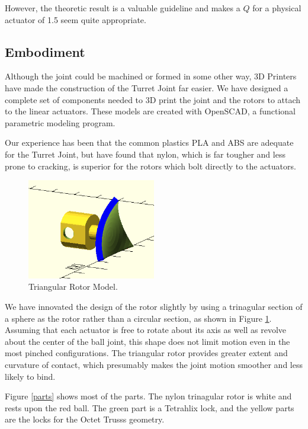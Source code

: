 \documentclass[11pt]{article}
\begin{document}
 However, the theoretic result is a valuable guideline and makes a $Q$ for a physical actuator of 1.5 seem quite appropriate.

 \subsection{Embodiment}

 Although the joint could be machined or formed in some other way,
 3D Printers have made the construction of the Turret Joint far easier.
 We have designed a complete set of components needed to 3D print the joint and the rotors to attach to
 the linear actuators. These models are created with OpenSCAD, a functional parametric modeling program.

 Our experience has been that the common plastics PLA and ABS are adequate for the Turret Joint,
 but have found that nylon, which is far tougher and less prone to cracking, is superior for the
 rotors which bolt directly to the actuators.

 \begin{figure}[!ht]
  \centering
    \includegraphics[width=0.5\textwidth]{RotorModel.png}
    \caption[Triangular Rotor Model]{Triangular Rotor Model.}
      \label{rotormodel}
\end{figure}

 We have innovated the design of the rotor slightly by using a trinagular section of a sphere as the
 rotor rather than a circular section, as shown in Figure \ref{rotormodel}.
 Assuming that each actuator is free to rotate about its axis as well as revolve about the
 center of the ball joint, this shape does not limit motion even in the most pinched
 configurations. The triangular rotor provides greater extent and curvature of contact,
 which presumably makes the joint motion
 smoother and less likely to bind.
 

 Figure \ref{parts} shows most of the parts. The nylon trinagular rotor is white and rests upon
 the red ball. The green part is a Tetrahlix lock, and the yellow parts are the locks for the Octet Trusss
 geometry.
\end{document}
